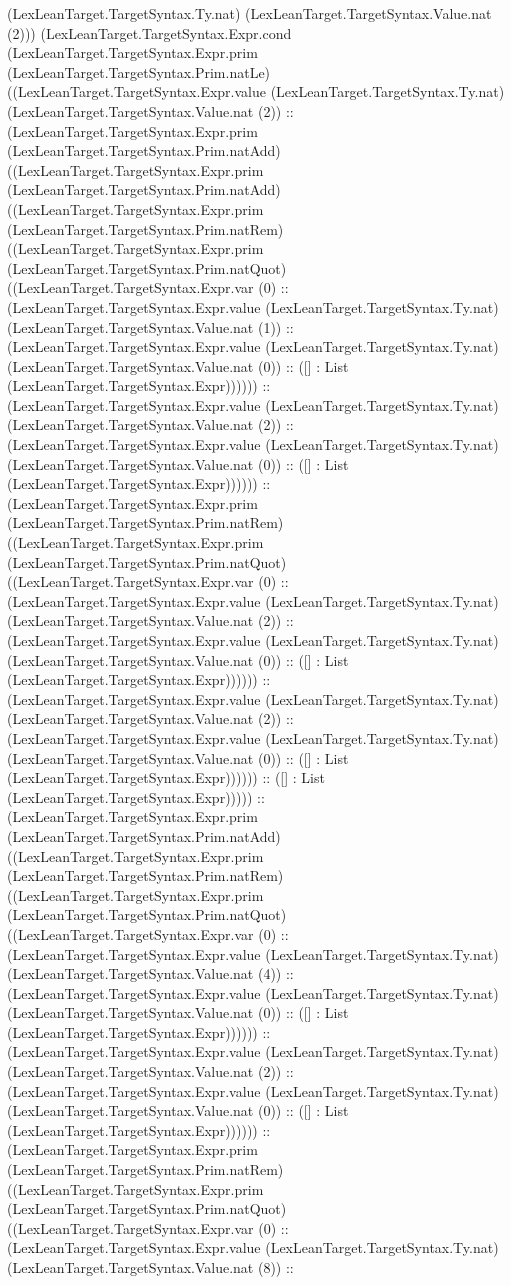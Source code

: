 \documentclass[11pt]{article}
\begin{document}
(LexLeanTarget.TargetSyntax.Ty.nat) (LexLeanTarget.TargetSyntax.Value.nat (2))) (LexLeanTarget.TargetSyntax.Expr.cond (LexLeanTarget.TargetSyntax.Expr.prim (LexLeanTarget.TargetSyntax.Prim.natLe) ((LexLeanTarget.TargetSyntax.Expr.value (LexLeanTarget.TargetSyntax.Ty.nat) (LexLeanTarget.TargetSyntax.Value.nat (2)) :: (LexLeanTarget.TargetSyntax.Expr.prim (LexLeanTarget.TargetSyntax.Prim.natAdd) ((LexLeanTarget.TargetSyntax.Expr.prim (LexLeanTarget.TargetSyntax.Prim.natAdd) ((LexLeanTarget.TargetSyntax.Expr.prim (LexLeanTarget.TargetSyntax.Prim.natRem) ((LexLeanTarget.TargetSyntax.Expr.prim (LexLeanTarget.TargetSyntax.Prim.natQuot) ((LexLeanTarget.TargetSyntax.Expr.var (0) :: (LexLeanTarget.TargetSyntax.Expr.value (LexLeanTarget.TargetSyntax.Ty.nat) (LexLeanTarget.TargetSyntax.Value.nat (1)) :: (LexLeanTarget.TargetSyntax.Expr.value (LexLeanTarget.TargetSyntax.Ty.nat) (LexLeanTarget.TargetSyntax.Value.nat (0)) :: ([] : List (LexLeanTarget.TargetSyntax.Expr)))))) :: (LexLeanTarget.TargetSyntax.Expr.value (LexLeanTarget.TargetSyntax.Ty.nat) (LexLeanTarget.TargetSyntax.Value.nat (2)) :: (LexLeanTarget.TargetSyntax.Expr.value (LexLeanTarget.TargetSyntax.Ty.nat) (LexLeanTarget.TargetSyntax.Value.nat (0)) :: ([] : List (LexLeanTarget.TargetSyntax.Expr)))))) :: (LexLeanTarget.TargetSyntax.Expr.prim (LexLeanTarget.TargetSyntax.Prim.natRem) ((LexLeanTarget.TargetSyntax.Expr.prim (LexLeanTarget.TargetSyntax.Prim.natQuot) ((LexLeanTarget.TargetSyntax.Expr.var (0) :: (LexLeanTarget.TargetSyntax.Expr.value (LexLeanTarget.TargetSyntax.Ty.nat) (LexLeanTarget.TargetSyntax.Value.nat (2)) :: (LexLeanTarget.TargetSyntax.Expr.value (LexLeanTarget.TargetSyntax.Ty.nat) (LexLeanTarget.TargetSyntax.Value.nat (0)) :: ([] : List (LexLeanTarget.TargetSyntax.Expr)))))) :: (LexLeanTarget.TargetSyntax.Expr.value (LexLeanTarget.TargetSyntax.Ty.nat) (LexLeanTarget.TargetSyntax.Value.nat (2)) :: (LexLeanTarget.TargetSyntax.Expr.value (LexLeanTarget.TargetSyntax.Ty.nat) (LexLeanTarget.TargetSyntax.Value.nat (0)) :: ([] : List (LexLeanTarget.TargetSyntax.Expr)))))) :: ([] : List (LexLeanTarget.TargetSyntax.Expr))))) :: (LexLeanTarget.TargetSyntax.Expr.prim (LexLeanTarget.TargetSyntax.Prim.natAdd) ((LexLeanTarget.TargetSyntax.Expr.prim (LexLeanTarget.TargetSyntax.Prim.natRem) ((LexLeanTarget.TargetSyntax.Expr.prim (LexLeanTarget.TargetSyntax.Prim.natQuot) ((LexLeanTarget.TargetSyntax.Expr.var (0) :: (LexLeanTarget.TargetSyntax.Expr.value (LexLeanTarget.TargetSyntax.Ty.nat) (LexLeanTarget.TargetSyntax.Value.nat (4)) :: (LexLeanTarget.TargetSyntax.Expr.value (LexLeanTarget.TargetSyntax.Ty.nat) (LexLeanTarget.TargetSyntax.Value.nat (0)) :: ([] : List (LexLeanTarget.TargetSyntax.Expr)))))) :: (LexLeanTarget.TargetSyntax.Expr.value (LexLeanTarget.TargetSyntax.Ty.nat) (LexLeanTarget.TargetSyntax.Value.nat (2)) :: (LexLeanTarget.TargetSyntax.Expr.value (LexLeanTarget.TargetSyntax.Ty.nat) (LexLeanTarget.TargetSyntax.Value.nat (0)) :: ([] : List (LexLeanTarget.TargetSyntax.Expr)))))) :: (LexLeanTarget.TargetSyntax.Expr.prim (LexLeanTarget.TargetSyntax.Prim.natRem) ((LexLeanTarget.TargetSyntax.Expr.prim (LexLeanTarget.TargetSyntax.Prim.natQuot) ((LexLeanTarget.TargetSyntax.Expr.var (0) :: (LexLeanTarget.TargetSyntax.Expr.value (LexLeanTarget.TargetSyntax.Ty.nat) (LexLeanTarget.TargetSyntax.Value.nat (8)) :: 
\end{document}
